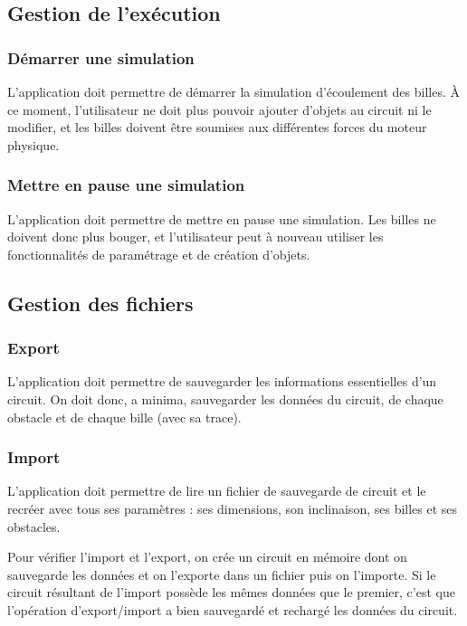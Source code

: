 \documentclass{report}
\begin{document}
\subsection{Gestion de l'exécution}

\subsubsection{Démarrer une simulation}

L’application doit permettre de démarrer la simulation d’écoulement des billes. À ce moment, l’utilisateur ne doit plus pouvoir ajouter d’objets au circuit ni le modifier, et les billes doivent être soumises aux différentes forces du moteur physique.

\subsubsection{Mettre en pause une simulation}

L’application doit permettre de mettre en pause une simulation. Les billes ne doivent donc plus bouger, et l’utilisateur peut à nouveau utiliser les fonctionnalités de paramétrage et de création d’objets.

\subsection{Gestion des fichiers}

\subsubsection{Export}

L’application doit permettre de sauvegarder les informations essentielles d’un circuit. On doit donc, a minima, sauvegarder les données du circuit, de chaque obstacle et de chaque bille (avec sa trace).

\subsubsection{Import}

L’application doit permettre de lire un fichier de sauvegarde de circuit et le recréer avec tous ses paramètres : ses dimensions, son inclinaison, ses billes et ses obstacles.

Pour vérifier l’import et l’export, on crée un circuit en mémoire dont on sauvegarde les données et on l’exporte dans un fichier puis on l’importe. Si le circuit résultant de l’import possède les mêmes données que le premier, c’est que l’opération d’export/import a bien sauvegardé et rechargé les données du circuit.
\end{document}
